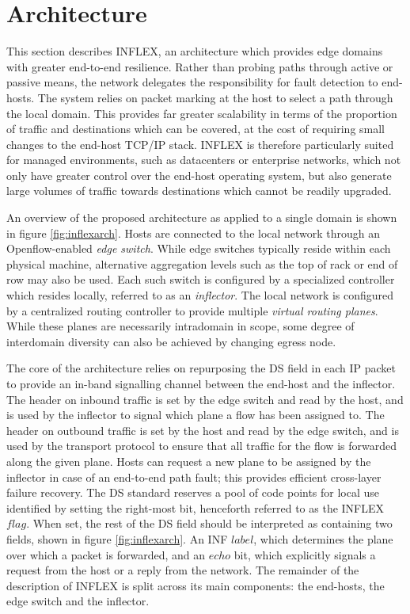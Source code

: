 \section{Architecture}
\label{section:arch}

This section describes INFLEX, an architecture which provides edge domains with greater end-to-end resilience.
Rather than probing paths through active or passive means, the network delegates the responsibility for fault detection to end-hosts.
The system relies on packet marking at the host to select a path through the local domain.
This provides far greater scalability in terms of the proportion of traffic and destinations which can be covered, at the cost of requiring small changes to the end-host \ac{TCP}/\ac{IP} stack.
INFLEX is therefore particularly suited for managed environments, such as datacenters or enterprise networks, which not only have greater control over the end-host operating system, but also generate large volumes of traffic towards destinations which cannot be readily upgraded.

An overview of the proposed architecture as applied to a single domain is shown in figure \ref{fig:inflexarch}.
Hosts are connected to the local network through an Openflow-enabled \emph{edge switch}.
While edge switches typically reside within each physical machine, alternative aggregation levels such as the top of rack or end of row may also be used.
Each such switch is configured by a specialized controller which resides locally, referred to as an \emph{inflector}.
The local network is configured by a centralized routing controller to provide multiple \emph{virtual routing planes}.
While these planes are necessarily intradomain in scope, some degree of interdomain diversity can also be achieved by changing egress node.

The core of the architecture relies on repurposing the \ac{DS} field in each \ac{IP} packet to provide an in-band signalling channel between the end-host and the inflector.
The header on inbound traffic is set by the edge switch and read by the host, and is used by the inflector to signal which plane a flow has been assigned to.
The header on outbound traffic is set by the host and read by the edge switch, and is used by the transport protocol to ensure that all traffic for the flow is forwarded along the given plane.
Hosts can request a new plane to be assigned by the inflector in case of an end-to-end path fault; this provides efficient cross-layer failure recovery.
The \ac{DS} standard \cite{Blake:1998p370} reserves a pool of code points for local use identified by setting the right-most bit, henceforth referred to as the INFLEX $flag$.
When set, the rest of the \ac{DS} field should be interpreted as containing two fields, shown in figure \ref{fig:inflexarch}. 
An \ac{INF} $label$, which determines the plane over which a packet is forwarded, and an $echo$ bit, which explicitly signals a request from the host or a reply from the network.
The remainder of the description of INFLEX is split across its main components: the end-hosts, the edge switch and the inflector.

